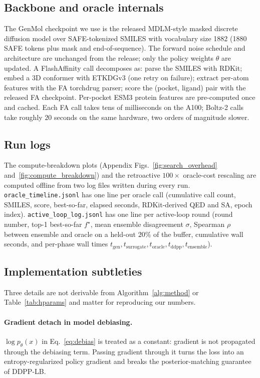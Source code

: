 \documentclass{article}
\begin{document}
\subsection{Backbone and oracle internals}

The GenMol checkpoint we use is the released MDLM-style masked discrete diffusion model over SAFE-tokenized SMILES \citep{noutahiGottaBeSAFE2023, sahoo2024mdlm} with vocabulary size 1882 (1880 SAFE tokens plus mask and end-of-sequence). The forward noise schedule and architecture are unchanged from the release; only the policy weights $\theta$ are updated. A FlashAffinity call decomposes as: parse the SMILES with RDKit; embed a 3D conformer with ETKDGv3 (one retry on failure); extract per-atom features with the FA torchdrug parser; score the (pocket, ligand) pair with the released FA checkpoint. Per-pocket ESM3 protein features are pre-computed once and cached. Each FA call takes tens of milliseconds on the A100; Boltz-2 calls take roughly $20$ seconds on the same hardware, two orders of magnitude slower.

\subsection{Run logs}

The compute-breakdown plots (Appendix Figs.~\ref{fig:search_overhead} and~\ref{fig:compute_breakdown}) and the retroactive $100\times$ oracle-cost rescaling are computed offline from two log files written during every run. \texttt{oracle\_timeline.jsonl} has one line per oracle call (cumulative call count, SMILES, score, best-so-far, elapsed seconds, RDKit-derived QED and SA, epoch index). \texttt{active\_loop\_log.jsonl} has one line per active-loop round (round number, top-1 best-so-far $f^\star$, mean ensemble disagreement $\sigma$, Spearman $\rho$ between ensemble and oracle on a held-out $20\%$ of the buffer, cumulative wall seconds, and per-phase wall times $t_{\text{gen}}, t_{\text{surrogate}}, t_{\text{oracle}}, t_{\text{ddpp}}, t_{\text{ensemble}}$).

\subsection{Implementation subtleties}

Three details are not derivable from Algorithm~\ref{alg:method} or Table~\ref{tab:hparams} and matter for reproducing our numbers.

\paragraph{Gradient detach in model debiasing.} $\log p_\theta(x)$ in Eq.~\ref{eq:debias} is treated as a constant: gradient is not propagated through the debiasing term. Passing gradient through it turns the loss into an entropy-regularized policy gradient and breaks the posterior-matching guarantee of DDPP-LB.
\end{document}
